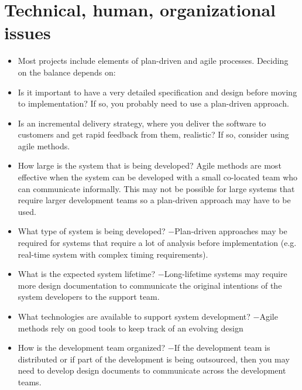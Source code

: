  \section{ Technical, human, organizational issues}
 \begin{itemize}

\item Most projects include elements of plan-driven and agile processes. Deciding on the balance depends on:

\item Is it important to have a very detailed specification and design before moving to implementation? If so, you probably need to use a plan-driven approach.
\item Is an incremental delivery strategy, where you deliver the software to customers and get rapid feedback from them, realistic? If so, consider using agile methods.
\item How large is the system that is being developed? Agile methods are most effective when the system can be developed with a small co-located team who can communicate informally. This may not be possible for large systems that require larger development teams so a plan-driven approach may have to be used.
\item What type of system is being developed?
\newline $-$Plan-driven approaches may be required for systems that require a lot of analysis before implementation (e.g. real-time system with complex timing requirements).
\item What is the expected system lifetime?
\newline $-$Long-lifetime systems may require more design documentation to communicate the original intentions of the system developers to the support team.
\item What technologies are available to support system development?
\newline $-$Agile methods rely on good tools to keep track of an evolving design
\item How is the development team organized?
\newline $-$If the development team is distributed or if part of the development is being outsourced, then you may need to develop design documents to communicate across the development teams.


\end{itemize}
